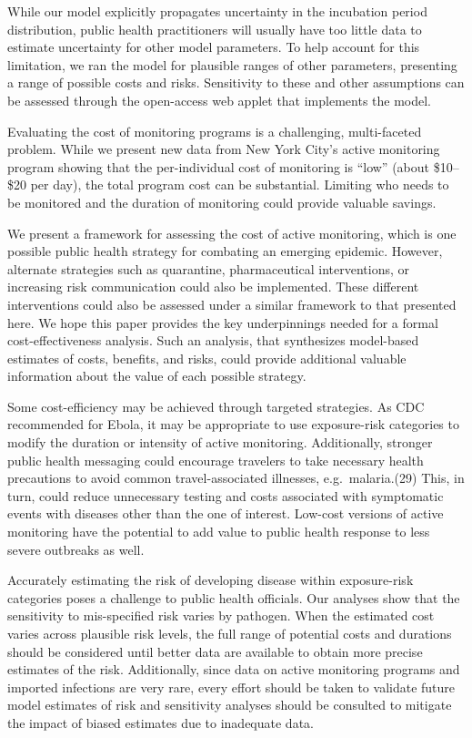\documentclass[]{article}
\begin{document}
While our model explicitly propagates uncertainty in the incubation
period distribution, public health practitioners will usually have too
little data to estimate uncertainty for other model parameters. To help
account for this limitation, we ran the model for plausible ranges of
other parameters, presenting a range of possible costs and risks.
Sensitivity to these and other assumptions can be assessed through the
open-access web applet that implements the model.

Evaluating the cost of monitoring programs is a challenging,
multi-faceted problem. While we present new data from New York City's
active monitoring program showing that the per-individual cost of
monitoring is ``low'' (about \$10--\$20 per day), the total program cost
can be substantial. Limiting who needs to be monitored and the duration
of monitoring could provide valuable savings.

We present a framework for assessing the cost of active monitoring,
which is one possible public health strategy for combating an emerging
epidemic. However, alternate strategies such as quarantine,
pharmaceutical interventions, or increasing risk communication could
also be implemented. These different interventions could also be
assessed under a similar framework to that presented here. We hope this
paper provides the key underpinnings needed for a formal
cost-effectiveness analysis. Such an analysis, that synthesizes
model-based estimates of costs, benefits, and risks, could provide
additional valuable information about the value of each possible
strategy.

Some cost-efficiency may be achieved through targeted strategies. As CDC
recommended for Ebola, it may be appropriate to use exposure-risk
categories to modify the duration or intensity of active monitoring.
Additionally, stronger public health messaging could encourage travelers
to take necessary health precautions to avoid common travel-associated
illnesses, e.g.~malaria.(29) This, in turn, could reduce unnecessary
testing and costs associated with symptomatic events with diseases other
than the one of interest. Low-cost versions of active monitoring have
the potential to add value to public health response to less severe
outbreaks as well.

Accurately estimating the risk of developing disease within
exposure-risk categories poses a challenge to public health officials.
Our analyses show that the sensitivity to mis-specified risk varies by
pathogen. When the estimated cost varies across plausible risk levels,
the full range of potential costs and durations should be considered
until better data are available to obtain more precise estimates of the
risk. Additionally, since data on active monitoring programs and
imported infections are very rare, every effort should be taken to
validate future model estimates of risk and sensitivity analyses should
be consulted to mitigate the impact of biased estimates due to
inadequate data.
\end{document}
